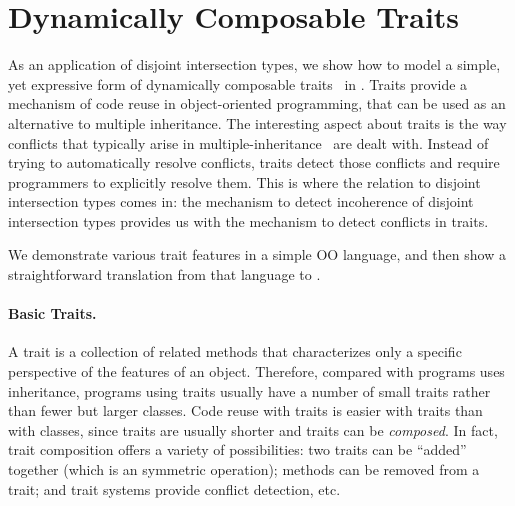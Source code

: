 \section{Dynamically Composable Traits} \label{sec:trait}


As an application of disjoint intersection types, we show how to model a
simple, yet expressive form of dynamically composable
traits~\cite{scharli2003traits} in \name. Traits provide a
mechanism of code reuse in object-oriented programming, that
can be used as an alternative to multiple inheritance.
The interesting aspect about traits is the way conflicts that
typically arise in multiple-inheritance~\cite{} are dealt with.
Instead of trying to automatically resolve conflicts, traits
detect those conflicts and require programmers to explicitly resolve
them. This is where the relation to disjoint intersection types comes
in: the mechanism to detect incoherence of disjoint intersection types
provides us with the mechanism to detect conflicts in traits.

We demonstrate various trait
features in a simple OO language, and then show a straightforward
translation from that language to \name. 

\paragraph{Basic Traits.}

A trait is a collection of related methods that characterizes only a specific
perspective of the features of an object. Therefore, compared with
programs uses inheritance, programs using traits usually have a number of small
traits rather than fewer but larger classes. Code reuse with traits is easier
with traits than with classes, since traits are usually shorter and traits can
be \emph{composed}. In fact, trait composition offers a variety of
possibilities: two traits can be ``added'' together (which is an symmetric
operation); methods can be removed from a trait; and trait systems provide
conflict detection, etc.

